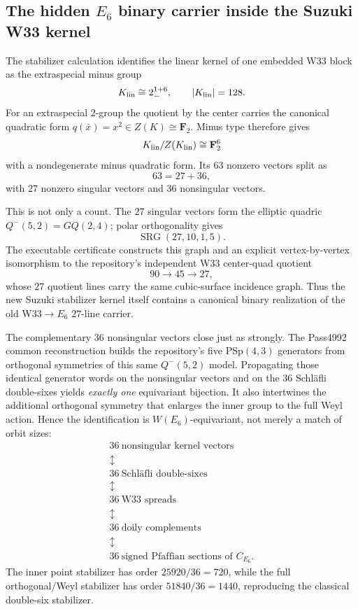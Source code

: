 \subsection{The hidden $E_6$ binary carrier inside the Suzuki W33 kernel}
\label{sec:20260917-suzuki-kernel-e6-shells}

The stabilizer calculation identifies the linear kernel of one embedded W33 block as the
extraspecial minus group
\[
 K_{\rm lin}\cong 2_-^{1+6},\qquad |K_{\rm lin}|=128.
\]
For an extraspecial $2$-group the quotient by the center carries the canonical quadratic
form $q(\bar x)=x^2\in Z(K)\cong\mathbf F_2$.  Minus type therefore gives
\[
 K_{\rm lin}/Z(K_{\rm lin})\cong \mathbf F_2^6
\]
with a nondegenerate minus quadratic form.  Its $63$ nonzero vectors split as
\[
 \boxed{63=27+36},
\]
with $27$ nonzero singular vectors and $36$ nonsingular vectors.

This is not only a count.  The $27$ singular vectors form the elliptic quadric
$Q^-(5,2)=GQ(2,4)$; polar orthogonality gives
\[
 \boxed{\operatorname{SRG}(27,10,1,5)}.
\]
The executable certificate constructs this graph and an explicit vertex-by-vertex
isomorphism to the repository's independent W33 center-quad quotient
\[
 90\longrightarrow45\longrightarrow27,
\]
whose $27$ quotient lines carry the same cubic-surface incidence graph.  Thus the new
Suzuki stabilizer kernel itself contains a canonical binary realization of the old
W33$\to E_6$ $27$-line carrier.

The complementary $36$ nonsingular vectors close just as strongly.  The Pass4992 common
reconstruction builds the repository's five $\mathrm{PSp}(4,3)$ generators from orthogonal
symmetries of this same $Q^-(5,2)$ model.  Propagating those identical generator words on the
nonsingular vectors and on the $36$ Schl\"afli double-sixes yields \emph{exactly one}
equivariant bijection.  It also intertwines the additional orthogonal symmetry that enlarges
the inner group to the full Weyl action.  Hence the identification is
$W(E_6)$-equivariant, not merely a match of orbit sizes:
\[
 \boxed{
 \begin{array}{c}
 36\ \text{nonsingular kernel vectors}
 \\ \updownarrow \\
 36\ \text{Schl\"afli double-sixes}
 \\ \updownarrow \\
 36\ \text{W33 spreads}
 \\ \updownarrow \\
 36\ \text{doily complements}
 \\ \updownarrow \\
 36\ \text{signed Pfaffian sections of }C_{E_6}.
 \end{array}}
\]
The inner point stabilizer has order $25920/36=720$, while the full orthogonal/Weyl
stabilizer has order $51840/36=1440$, reproducing the classical double-six stabilizer.

